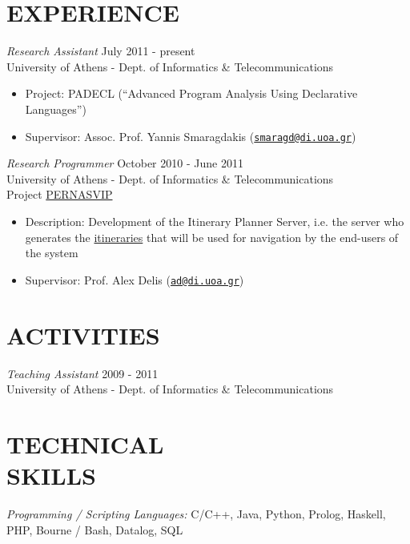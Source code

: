 \documentclass[margin]{res}
\begin{document}
\begin{resume}
\section{EXPERIENCE}
        {\sl Research Assistant} \hfill July 2011 - present \\
        University of Athens - Dept. of Informatics \& Telecommunications
        \begin{itemize} \itemsep -2pt %
        \item Project: PADECL (``Advanced Program Analysis Using Declarative Languages'')
        \item Supervisor: Assoc. Prof. Yannis Smaragdakis
          (\href{mailto:smaragd@di.uoa.gr}{\nolinkurl{smaragd@di.uoa.gr}})
        \end{itemize}
        
        {\sl Research Programmer} \hfill October 2010 - June 2011 \\
        University of Athens - Dept. of Informatics \& Telecommunications \\
        Project \href{http://pernasvip.di.uoa.gr/index.php}{PERNASVIP}
        \begin{itemize}
        \item Description: Development of the Itinerary Planner Server, i.e. the server who
          generates the 
          \href{http://pernasvip.di.uoa.gr/index.php/gen-spef/itinerary-example}{itineraries} 
          that will be used for navigation by the end-users of the system
        \item Supervisor: Prof. Alex Delis
          (\href{mailto:ad@di.uoa.gr}{\nolinkurl{ad@di.uoa.gr}})
        \end{itemize}
            
\section{ACTIVITIES}
        {\sl Teaching Assistant} \hfill 2009 - 2011 \\
        University of Athens - Dept. of Informatics \& Telecommunications

\section{TECHNICAL \\ SKILLS}
        {\sl Programming / Scripting Languages:} 
        C/C++, Java, Python, Prolog, Haskell, PHP, Bourne / Bash, Datalog, SQL


\end{resume}
\end{document}
